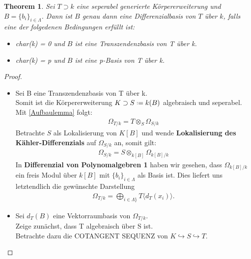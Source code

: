 \documentclass[10pt,a4paper]{report}
\newcommand{\comment}[1]{}
\newcounter{Aussage}[chapter]
\newtheorem{theorem}[Aussage]{Theorem}
\newcommand{\divR}[2]{\Omega_{#1/#2}}
\newcommand{\divf}[1]{d_{#1}}
\newcommand{\Tensor}[3]{#1 \otimes_{#2} #3}
\newcommand*{\defeq}{\mathrel{\vcenter{\baselineskip0.5ex \lineskiplimit0pt
                     \hbox{\scriptsize.}\hbox{\scriptsize.}}}%
                     =}
\begin{document}
\begin{theorem}\comment{\label{Differenzial-Körperbasis}}
Sei $T \supset k$ eine seperabel generierte Körpererweiterung und $B = \lbrace b_i \rbrace_{i \in \Lambda}$. Dann ist $B$ genau dann eine Differenzialbasis von $T$ über $k$, falls eine der folgedenen Bedingungen erfüllt ist:
\begin{itemize}
\item[\textbf{1.}] char(k) = 0 und $B$ ist eine Transzendenzbasis von T über k.
\item[\textit{2.}] char(k) = p und $B$ ist eine p-Basis von T über k.
\end{itemize}
\end{theorem}
\begin{proof}
\ \\
\begin{itemize}
\item[\underline{\textbf{1.}"$\Rightarrow$":}] Sei B eine Transzendenzbasis von T über k.\\
Somit ist die Körpererweiterung $K \supset S \defeq k(B)$ algebraisch und seperabel. Mit \cref{Aufbaulemma} folgt:
\begin{gather*}
\divR{T}{k} = \Tensor{T}{S}{\divR{S}{k}}
\end{gather*}
Betrachte $S$ als Lokalisierung von $K[B]$ und wende \textbf{Lokalisierung des Kähler-Differenzials} \comment{\cref{Lokalisierung des Kähler-Differenzials}} auf $\divR{S}{k}$ an, somit gilt:
\begin{gather*}
\divR{S}{k} = \Tensor{S}{k[B]}{\divR{k[B]}{k}}
\end{gather*}
In \textbf{Differenzial von Polynomalgebren 1} \comment{\label{dies brauche ich allerdings für unendliche Mengen Lambda}\cref{Differenzial von Polynomalgebren 1}} haben wir gesehen, dass $\divR{k[B]}{k}$ ein freis Modul über $k[B]$ mit $\lbrace b_i \rbrace_{i \in \Lambda}$ als Basis ist. Dies liefert uns letztendlich die gewünschte Darstellung
\begin{gather*}
\divR{T}{k} = \bigoplus_{i \in \Lambda \rbrace} T \langle \divf{T}(x_i) \rangle .
\end{gather*}
\item[\underline{\textbf{1.}"$\Leftarrow$":}]Sei $\divf{T}(B)$ eine Vektorraumbasis von $\divR{T}{k}$.\\
Zeige zunächst, dass T algebraisch über S ist.\\
Betrachte dazu die COTANGENT SEQUENZ \comment{\label{*Prop 16.2}} von $K \hookrightarrow S \hookrightarrow T$.
\begin{center}

\end{center}
\end{itemize}
\end{proof}
\end{document}
